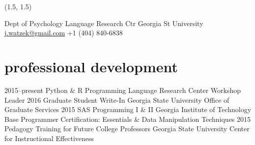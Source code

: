 \documentclass[]{friggeri-cv}
\begin{document}
\renewenvironment{aside}{%
  \let\oldsection\section
  \renewcommand{\section}[1]{
    \par\vspace{\baselineskip}{\Large\headingfont\color{headercolor} ##1}
  }
  \begin{textblock}{3.6}(1.5, 1.5)
  \begin{flushright}
  \obeycr
}{%
  \restorecr
  \end{flushright}
  \end{textblock}
  \let\section\oldsection
}


\begin{aside}
  \section{{\normalfont julia}watzek}
    Dept of Psychology
    Language Research Ctr
    Georgia St University
    ~
    \href{mailto:j.watzek@gmail.com}{j.watzek@gmail.com}
    +1 (404) 840-6838
\end{aside}


\section{professional development}

\begin{entrylist}
  \entry
    {2015--present}
    {Python \& R Programming}
    {Language Research Center}
    {Workshop Leader} %
  \entry
    {2016}
    {Graduate Student Write-In}
    {Georgia State University}
    {Office of Graduate Services}
  \entry
    {2015}
    {SAS Programming I \& II}
    {Georgia Institute of Technology}
    {Base Programmer Certification: Essentials \& Data Manipulation Techniques}
  \entry
    {2015}
    {Pedagogy Training for Future College Professors}
    {Georgia State University}
    {Center for Instructional Effectiveness}
\end{entrylist}
\end{document}
